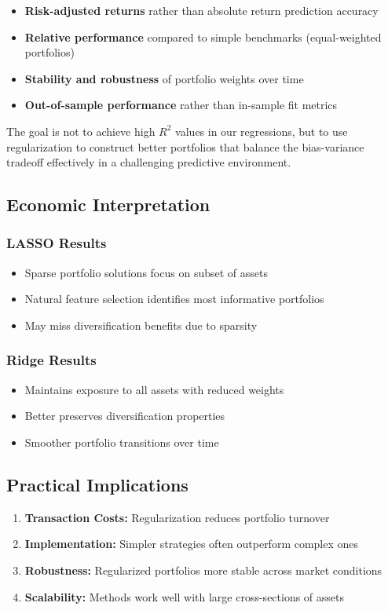 \documentclass[12pt]{article}
\begin{document}
\begin{itemize}
    \item \textbf{Risk-adjusted returns} rather than absolute return prediction accuracy
    \item \textbf{Relative performance} compared to simple benchmarks (equal-weighted portfolios)
    \item \textbf{Stability and robustness} of portfolio weights over time
    \item \textbf{Out-of-sample performance} rather than in-sample fit metrics
\end{itemize}

The goal is not to achieve high $R^2$ values in our regressions, but to use regularization to construct better portfolios that balance the bias-variance tradeoff effectively in a challenging predictive environment.

\subsection{Economic Interpretation}
\subsubsection{LASSO Results}
\begin{itemize}
    \item Sparse portfolio solutions focus on subset of assets
    \item Natural feature selection identifies most informative portfolios
    \item May miss diversification benefits due to sparsity
\end{itemize}

\subsubsection{Ridge Results}
\begin{itemize}
    \item Maintains exposure to all assets with reduced weights
    \item Better preserves diversification properties
    \item Smoother portfolio transitions over time
\end{itemize}

\subsection{Practical Implications}
\begin{enumerate}
    \item \textbf{Transaction Costs:} Regularization reduces portfolio turnover
    \item \textbf{Implementation:} Simpler strategies often outperform complex ones
    \item \textbf{Robustness:} Regularized portfolios more stable across market conditions
    \item \textbf{Scalability:} Methods work well with large cross-sections of assets
\end{enumerate}
\end{document}

